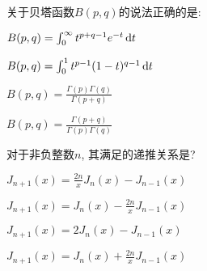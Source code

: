 \documentclass{njustexam}
\begin{document}






\begin{problem}
  关于贝塔函数$B(p,  q)$的说法正确的是:
\begin{abcd}
  \item $B(p,  q) = \int_{0}^{\infty} t^{p+q-1}e^{-t} \mathop{}\!\mathrm{d} t$
  \item $B(p,  q) = \int_{0}^{1} t^{p-1}(1-t)^{q-1} \mathop{}\!\mathrm{d} t$
  \item $B(p,  q) = \frac{\Gamma(p)\Gamma(q)}{\Gamma(p+q)}$
  \item $B(p,  q) = \frac{\Gamma(p+q)}{\Gamma(p)\Gamma(q)}$
\end{abcd}
\end{problem}









\begin{problem}
   对于非负整数$n$, 其满足的递推关系是?
  \begin{abcd}
    \item  $J_{n+1}(x) = \frac{2n}{x} J_n(x) - J_{n-1}(x)$
    \item  $J_{n+1}(x) = J_n(x) - \frac{2n}{x} J_{n-1}(x)$
    \item  $J_{n+1}(x) = 2 J_n(x) - J_{n-1}(x)$
    \item  $J_{n+1}(x) = J_n(x) + \frac{2n}{x} J_{n-1}(x)$
  \end{abcd}
\end{problem}
\end{document}
